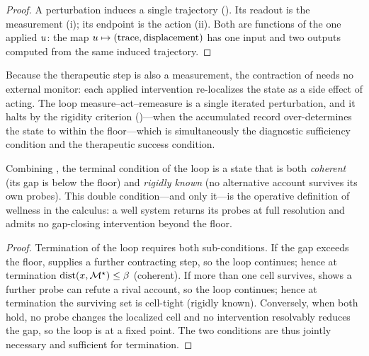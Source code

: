 \begin{proof}
A perturbation induces a single trajectory (). Its readout is
the measurement (i); its endpoint is the action (ii). Both are functions of the
one applied $u$: the map $u\mapsto(\text{trace},\text{displacement})$
has one input and two outputs computed from the same induced trajectory.
\end{proof}

\begin{corollary}
\label{cfc:cor:loop}
Because the therapeutic step is also a measurement, the contraction of
 needs no external monitor: each applied intervention
re-localizes the state as a side effect of acting. The loop
measure--act--remeasure is a single iterated perturbation, and it halts by the
rigidity criterion ()---when the accumulated record
over-determines the state to within the floor---which is simultaneously the
diagnostic sufficiency condition and the therapeutic success condition.
\end{corollary}

\begin{theorem}
\label{cfc:thm:wellness}
Combining , the terminal condition of the
 loop is a state that is both \emph{coherent} (its gap is below the
floor) and \emph{rigidly known} (no alternative account survives its own
probes). This double condition---and only it---is the operative definition of
wellness in the calculus: a well system returns its probes at full resolution
and admits no gap-closing intervention beyond the floor.
\end{theorem}

\begin{proof}
Termination of the loop requires both sub-conditions. If the gap exceeds the
floor,  supplies a further contracting step, so the loop
continues; hence at termination $\operatorname{dist}(x,\mathcal{M}^{\star})\le\beta$ (coherent). If more
than one cell survives,  shows a further probe can refute a
rival account, so the loop continues; hence at termination the surviving set is
cell-tight (rigidly known). Conversely, when both hold, no probe changes the
localized cell and no intervention resolvably reduces the gap, so the loop is at
a fixed point. The two conditions are thus jointly necessary and sufficient for
termination.
\end{proof}

